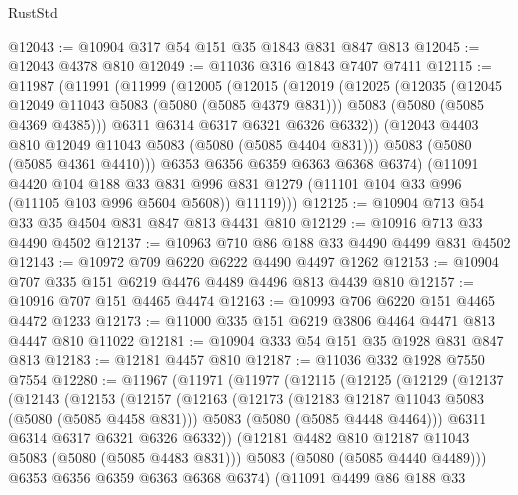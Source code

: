 \begin{lexlean}{RustStd}
\begin{coremodule}
{\begin{coremodule}
{{{{{@12043 := @10904 @317 @54 @151 @35 @1843 @831 @847 @813
@12045 := @12043 @4378 @810
@12049 := @11036 @316 @1843 @7407 @7411
@12115 := @11987
    (@11991
      (@11999
        (@12005
          (@12015
            (@12019
              (@12025
                (@12035
                  (@12045 @12049 @11043 @5083 (@5080 (@5085 @4379 @831)))
                  @5083
                  (@5080 (@5085 @4369 @4385)))
                @6311
                @6314
                @6317
                @6321
                @6326
                @6332))
            (@12043 @4403 @810 @12049 @11043 @5083 (@5080 (@5085 @4404 @831)))
            @5083
            (@5080 (@5085 @4361 @4410)))
          @6353
          @6356
          @6359
          @6363
          @6368
          @6374)
        (@11091
          @4420
          @104
          @188
          @33
          @831
          @996
          @831
          @1279
          (@11101 @104 @33 @996 (@11105 @103 @996 @5604 @5608))
          @11119)))
@12125 := @10904 @713 @54 @33 @35 @4504 @831 @847 @813 @4431 @810
@12129 := @10916 @713 @33 @4490 @4502
@12137 := @10963 @710 @86 @188 @33 @4490 @4499 @831 @4502
@12143 := @10972 @709 @6220 @6222 @4490 @4497 @1262
@12153 := @10904 @707 @335 @151 @6219 @4476 @4489 @4496 @813 @4439 @810
@12157 := @10916 @707 @151 @4465 @4474
@12163 := @10993 @706 @6220 @151 @4465 @4472 @1233
@12173 := @11000 @335 @151 @6219 @3806 @4464 @4471 @813 @4447 @810 @11022
@12181 := @10904 @333 @54 @151 @35 @1928 @831 @847 @813
@12183 := @12181 @4457 @810
@12187 := @11036 @332 @1928 @7550 @7554
@12280 := @11967
    (@11971
      (@11977
        (@12115
          (@12125
            (@12129
              (@12137
                (@12143
                  (@12153
                    (@12157
                      (@12163
                        (@12173
                          (@12183 @12187 @11043 @5083 (@5080 (@5085 @4458 @831)))
                          @5083
                          (@5080 (@5085 @4448 @4464)))
                        @6311
                        @6314
                        @6317
                        @6321
                        @6326
                        @6332))
                    (@12181 @4482 @810 @12187 @11043 @5083 (@5080 (@5085 @4483 @831)))
                    @5083
                    (@5080 (@5085 @4440 @4489)))
                  @6353
                  @6356
                  @6359
                  @6363
                  @6368
                  @6374)
                (@11091
                  @4499
                  @86
                  @188
                  @33
}}}}}
\end{coremodule}}
\end{coremodule}
\end{lexlean}
